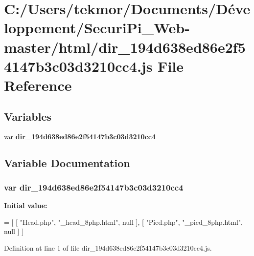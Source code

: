 \section{C\+:/\+Users/tekmor/\+Documents/\+Développement/\+Securi\+Pi\+\_\+\+Web-\/master/html/dir\+\_\+194d638ed86e2f54147b3c03d3210cc4.js File Reference}
\label{dir__194d638ed86e2f54147b3c03d3210cc4_8js}
\subsection*{Variables}
\begin{DoxyCompactItemize}
\item 
var {\bf dir\+\_\+194d638ed86e2f54147b3c03d3210cc4}
\end{DoxyCompactItemize}


\subsection{Variable Documentation}
\subsubsection[{dir\+\_\+194d638ed86e2f54147b3c03d3210cc4}]{\setlength{\rightskip}{0pt plus 5cm}var dir\+\_\+194d638ed86e2f54147b3c03d3210cc4}\label{dir__194d638ed86e2f54147b3c03d3210cc4_8js_a232b972309ceb0cbed0a21ac7467a723}
{\bfseries Initial value\+:}
\begin{DoxyCode}
=
[
    [ \textcolor{stringliteral}{"Head.php"}, \textcolor{stringliteral}{"\_head\_8php.html"}, null ],
    [ \textcolor{stringliteral}{"Pied.php"}, \textcolor{stringliteral}{"\_pied\_8php.html"}, null ]
]
\end{DoxyCode}


Definition at line 1 of file dir\+\_\+194d638ed86e2f54147b3c03d3210cc4.\+js.


